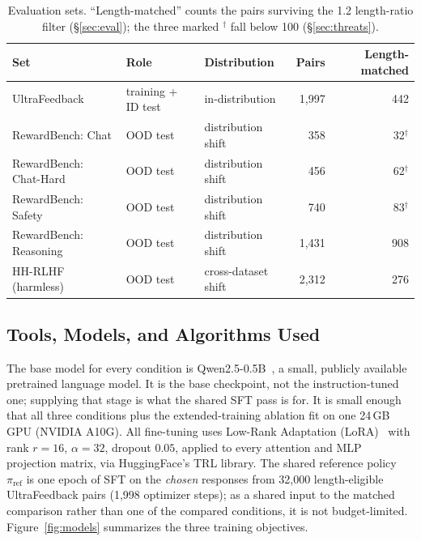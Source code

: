\documentclass[11pt]{article}
\begin{document}
\begin{table}[H]
\centering
\caption{Evaluation sets. ``Length-matched'' counts the pairs surviving the 1.2 length-ratio
filter (\S\ref{sec:eval}); the three marked $^\dagger$ fall below 100 (\S\ref{sec:threats}).}
\label{tab:datasets}
\begin{tabular}{lllrr}
\toprule
Set & Role & Distribution & Pairs & Length-matched \\
\midrule
UltraFeedback & training + ID test & in-distribution & 1{,}997 & 442 \\
RewardBench: Chat & OOD test & distribution shift & 358 & 32$^\dagger$ \\
RewardBench: Chat-Hard & OOD test & distribution shift & 456 & 62$^\dagger$ \\
RewardBench: Safety & OOD test & distribution shift & 740 & 83$^\dagger$ \\
RewardBench: Reasoning & OOD test & distribution shift & 1{,}431 & 908 \\
HH-RLHF (harmless) & OOD test & cross-dataset shift & 2{,}312 & 276 \\
\bottomrule
\end{tabular}
\end{table}

\subsection{Tools, Models, and Algorithms Used}
\label{sec:tools}
The base model for every condition is Qwen2.5-0.5B~\cite{qwen2025}, a small, publicly available
pretrained language model. It is the base checkpoint, not the instruction-tuned one; supplying
that stage is what the shared SFT pass is for. It is small enough that all three conditions plus
the extended-training ablation fit on one 24\,GB GPU (NVIDIA A10G). All fine-tuning uses
Low-Rank Adaptation (LoRA)~\cite{hu2022lora} with rank $r=16$, $\alpha=32$, dropout $0.05$,
applied to every attention and MLP projection matrix, via HuggingFace's TRL library. The shared
reference policy $\pi_{\mathrm{ref}}$ is one epoch of SFT on the \emph{chosen} responses from
32,000 length-eligible UltraFeedback pairs (1,998 optimizer steps); as a shared input to the
matched comparison rather than one of the compared conditions, it is not budget-limited.
Figure~\ref{fig:models} summarizes the three training objectives.
\end{document}
